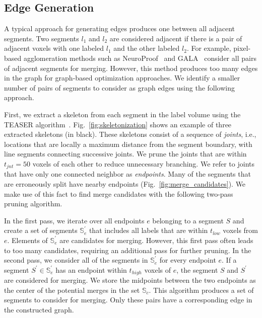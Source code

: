 \subsection{Edge Generation}

A typical approach for generating edges produces one between all adjacent segments. Two segments $l_1$ and $l_2$ are considered adjacent if there is a pair of adjacent voxels with one labeled $l_1$ and the other labeled $l_2$.
For example, pixel-based agglomeration methods such as NeuroProof~\cite{10.1371/journal.pone.0125825} and GALA~\cite{nunez2014graph} consider all pairs of adjacent segments for merging.
However, this method produces too many edges in the graph for graph-based optimization approaches. We identify a smaller number of pairs of segments to consider as graph edges using the following approach.

First, we extract a skeleton from each segment in the label volume using the TEASER algorithm~\cite{sato2000teasar,zhao2014automatic}. Fig.~\ref{fig:skeletonization} shows an example of three extracted skeletons (in black). These skeletons consist of a sequence of \textit{joints}, i.e., locations that are locally a maximum distance from the segment boundary, with line segments connecting successive joints. We prune the joints that are within $t_{jnt} = 50$ voxels of each other to reduce unnecessary branching. We refer to joints that have only one connected neighbor as \textit{endpoints}. Many of the segments that are erroneously split have nearby endpoints  (Fig.~\ref{fig:merge_candidates}). We make use of this fact to find merge candidates with the following two-pass pruning algorithm.

In the first pass, we iterate over all endpoints $e$ belonging to a segment $S$ and create a set of segments $\mathbb{S}_e^\prime$ that includes all labels that are within $t_{low}$ voxels from $e$. Elements of $\mathbb{S}_e^\prime$ are candidates for merging. However, this first pass often leads to too many candidates, requiring an additional pass for further pruning. In the second pass, we consider all of the segments in $\mathbb{S}_e^\prime$ for every endpoint $e$. If a segment $S^\prime \in \mathbb{S}_e^\prime$ has an endpoint within $t_{high}$ voxels of $e$, the segment $S$ and $S^\prime$ are considered for merging. We store the midpoints between the two endpoints as the center of the potential merges in the set $\mathbb{S}_c$. This algorithm produces a set of segments to consider for merging. Only these pairs have a corresponding edge in the constructed graph.




